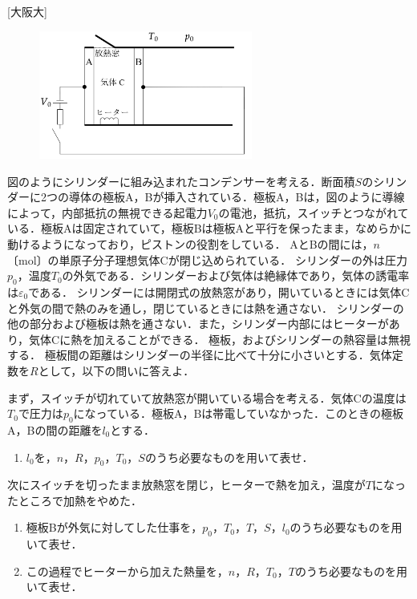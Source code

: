 


\noindent
{} [大阪大]

\begin{figure}
  \centering
  \includegraphics[width=7cm]{fig/fig_4_24.pdf}
\end{figure}
図のようにシリンダーに組み込まれたコンデンサーを考える．断面積$S$のシリンダーに2つの導体の極板A，Bが挿入されている．極板A，Bは，図のように導線によって，内部抵抗の無視できる起電力$V_0$の電池，抵抗，スイッチとつながれている．極板Aは固定されていて，極板Bは極板Aと平行を保ったまま，なめらかに動けるようになっており，ピストンの役割をしている．
AとBの間には，$n$〔mol〕の単原子分子理想気体Cが閉じ込められている．
シリンダーの外は圧力$p_0$，温度$T_0$の外気である．シリンダーおよび気体は絶縁体であり，気体の誘電率は$\varepsilon_0$である．
シリンダーには開閉式の放熱窓があり，開いているときには気体Cと外気の間で熱のみを通し，閉じているときには熱を通さない．
シリンダーの他の部分および極板は熱を通さない．また，シリンダー内部にはヒーターがあり，気体Cに熱を加えることができる．
極板，およびシリンダーの熱容量は無視する．
極板間の距離はシリンダーの半径に比べて十分に小さいとする．気体定数を$R$として，以下の問いに答えよ．

まず，スイッチが切れていて放熱窓が開いている場合を考える．気体Cの温度は$T_0$で圧力は$p_0$になっている．極板A，Bは帯電していなかった．このときの極板A，Bの間の距離を$l_0$とする．
\begin{enumerate}[(1)]
  \item $l_0$を，$n$，$R$，$p_0$，$T_0$，$S$のうち必要なものを用いて表せ．
\end{enumerate}

次にスイッチを切ったまま放熱窓を閉じ，ヒーターで熱を加え，温度が$T$になったところで加熱をやめた．
\begin{enumerate}[(1), resume]
  \item  極板Bが外気に対してした仕事を，$p_0$，$T_0$，$T$，$S$，$l_0$のうち必要なものを用いて表せ．　
  \item この過程でヒーターから加えた熱量を，$n$，$R$，$T_0$，$T$のうち必要なものを用いて表せ．
\end{enumerate}

